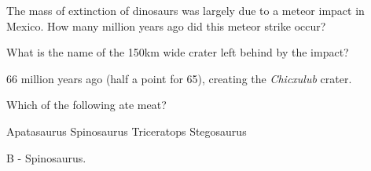 \documentclass[answers]{exam}
\begin{document}
\begin{questions}
    \question The mass of extinction of dinosaurs was largely due to a meteor impact in Mexico. How many million years ago did this meteor strike occur?

    \begin{parts}
        \bonuspart What is the name of the 150km wide crater left behind by the impact?
    \end{parts}
    \begin{solution}
        66 million years ago (half a point for 65), creating the \emph{Chicxulub} crater.
    \end{solution}


    \question Which of the following ate meat?

    \begin{choices}
        \choice Apatasaurus
        \choice Spinosaurus
        \choice Triceratops
        \choice Stegosaurus
    \end{choices}
    \begin{solution}
        B - Spinosaurus.
    \end{solution}



\end{questions}
\end{document}
